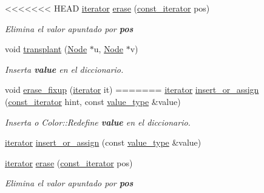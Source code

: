 \begin{Indent}
\begin{DoxyCompactItemize}
\item 
<<<<<<< HEAD
\hyperlink{classaed2_1_1map_1_1iterator}{iterator} \hyperlink{classaed2_1_1map_ad8e796bf9c9c558e5ce6b61e116253fe_ad8e796bf9c9c558e5ce6b61e116253fe}{erase} (\hyperlink{classaed2_1_1map_1_1const__iterator}{const\-\_\-iterator} pos)
\begin{DoxyCompactList}\small\item\em \-Elimina el valor apuntado por {\bfseries pos} \end{DoxyCompactList}\item 
void \hyperlink{classaed2_1_1map_a98b9f200c64ce02dfb67902ee00e375a_a98b9f200c64ce02dfb67902ee00e375a}{transplant} (\hyperlink{structaed2_1_1map_1_1Node}{\-Node} $\ast$u, \hyperlink{structaed2_1_1map_1_1Node}{\-Node} $\ast$v)
\begin{DoxyCompactList}\small\item\em \-Inserta {\bfseries value} en el diccionario. \end{DoxyCompactList}\item 
void \hyperlink{classaed2_1_1map_a7870c8f26e82b00d0aeb2e9f331dfec6_a7870c8f26e82b00d0aeb2e9f331dfec6}{erase\-\_\-fixup} (\hyperlink{classaed2_1_1map_1_1iterator}{iterator} it)
=======
\hyperlink{classaed2_1_1map_1_1iterator}{iterator} \hyperlink{classaed2_1_1map_a2ef6723c183916276b0afc4a4c721475_a2ef6723c183916276b0afc4a4c721475}{insert\+\_\+or\+\_\+assign} (\hyperlink{classaed2_1_1map_1_1const__iterator}{const\+\_\+iterator} hint, const \hyperlink{classaed2_1_1map_a719db98e0ff9a837610f76be33264680_a719db98e0ff9a837610f76be33264680}{value\+\_\+type} \&value)
\begin{DoxyCompactList}\small\item\em Inserta o Color\+::\+Redefine {\bfseries value} en el diccionario. \end{DoxyCompactList}\item 
\hyperlink{classaed2_1_1map_1_1iterator}{iterator} \hyperlink{classaed2_1_1map_a9128a806713bcc999ebd8a97ab77e765_a9128a806713bcc999ebd8a97ab77e765}{insert\+\_\+or\+\_\+assign} (const \hyperlink{classaed2_1_1map_a719db98e0ff9a837610f76be33264680_a719db98e0ff9a837610f76be33264680}{value\+\_\+type} \&value)
\item 
\hyperlink{classaed2_1_1map_1_1iterator}{iterator} \hyperlink{classaed2_1_1map_ad8e796bf9c9c558e5ce6b61e116253fe_ad8e796bf9c9c558e5ce6b61e116253fe}{erase} (\hyperlink{classaed2_1_1map_1_1const__iterator}{const\+\_\+iterator} pos)
\begin{DoxyCompactList}\small\item\em Elimina el valor apuntado por {\bfseries pos} \end{DoxyCompactList}\item 

\end{DoxyCompactItemize}
\end{Indent}
